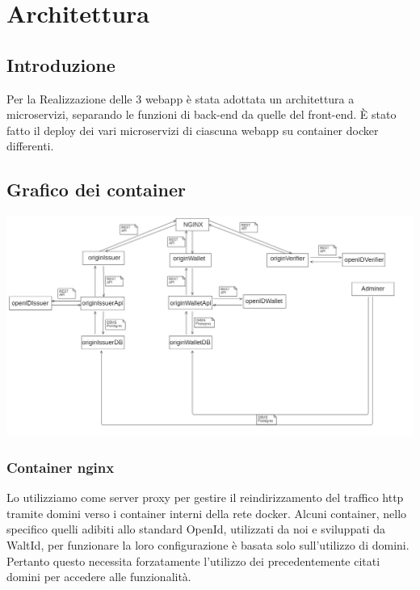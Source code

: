 \section{Architettura}

\subsection{Introduzione}
Per la Realizzazione delle 3 webapp è stata adottata un architettura a microservizi, separando le funzioni di back-end da quelle del front-end. È stato fatto il deploy dei vari microservizi di ciascuna webapp su container docker differenti.
\subsection{Grafico dei container}

\includegraphics[scale = 0.3]{./res/img/microservizi.png}


\subsubsection{Container \textbf{nginx}}
Lo utilizziamo come server proxy per gestire il reindirizzamento del traffico http tramite domini verso i container interni della rete docker. Alcuni container, nello specifico quelli adibiti allo standard OpenId, utilizzati da noi e sviluppati da WaltId, per funzionare la loro configurazione è basata solo sull'utilizzo di domini. Pertanto questo necessita forzatamente l'utilizzo dei precedentemente citati domini per accedere alle funzionalità.  

